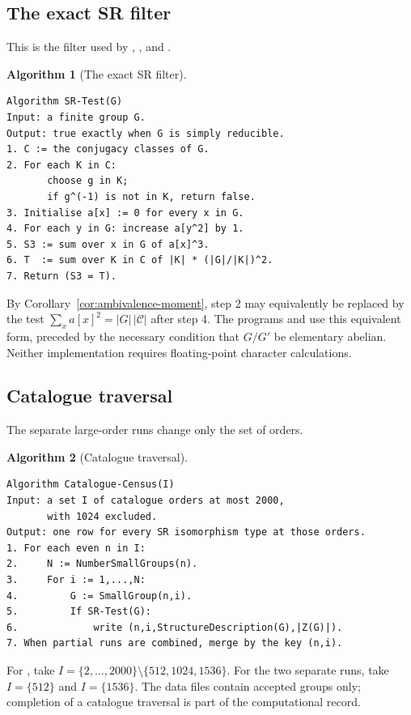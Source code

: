 \documentclass[11pt,a4paper]{amsart}
\theoremstyle{definition}
\newtheorem{algorithm}{Algorithm}
\theoremstyle{remark}
\numberwithin{equation}{section}
\begin{document}
\subsection{The exact SR filter}
This is the filter used by ,
, and .
\par\noindent\begin{minipage}{\linewidth}
\begin{algorithm}[The exact SR filter]\label{alg:srtest}
\leavevmode\par
\begin{lstlisting}
Algorithm SR-Test(G)
Input: a finite group G.
Output: true exactly when G is simply reducible.
1. C := the conjugacy classes of G.
2. For each K in C:
       choose g in K;
       if g^(-1) is not in K, return false.
3. Initialise a[x] := 0 for every x in G.
4. For each y in G: increase a[y^2] by 1.
5. S3 := sum over x in G of a[x]^3.
6. T  := sum over K in C of |K| * (|G|/|K|)^2.
7. Return (S3 = T).
\end{lstlisting}
\end{algorithm}
\end{minipage}\par\medskip
By Corollary~\ref{cor:ambivalence-moment}, step 2 may equivalently be replaced
by the test $\sum_x a[x]^2=|G|\,|\mathcal C|$ after step 4.
The programs  and  use
this equivalent form, preceded by the necessary condition that
$G/G'$ be elementary abelian. Neither implementation requires
floating-point character calculations.

\subsection{Catalogue traversal}
The separate large-order runs change only the set of orders.
\par\noindent\begin{minipage}{\linewidth}
\begin{algorithm}[Catalogue traversal]\label{alg:catalogue}
\leavevmode\par
\begin{lstlisting}
Algorithm Catalogue-Census(I)
Input: a set I of catalogue orders at most 2000,
       with 1024 excluded.
Output: one row for every SR isomorphism type at those orders.
1. For each even n in I:
2.     N := NumberSmallGroups(n).
3.     For i := 1,...,N:
4.         G := SmallGroup(n,i).
5.         If SR-Test(G):
6.             write (n,i,StructureDescription(G),|Z(G)|).
7. When partial runs are combined, merge by the key (n,i).
\end{lstlisting}
\end{algorithm}
\end{minipage}\par\medskip
For , take
$I=\{2,\ldots,2000\}\setminus\{512,1024,1536\}$.
For the two separate runs, take $I=\{512\}$ and $I=\{1536\}$.
The data files contain accepted groups only; completion of a
catalogue traversal is part of the computational record.
\end{document}
